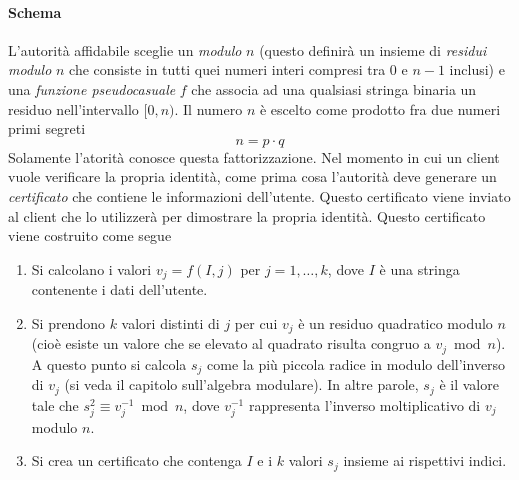 \documentclass{article}
\theoremstyle{definition}
\begin{document}
\paragraph{Schema}
L'autorità affidabile sceglie un \emph{modulo} $n$ (questo definirà un insieme di \emph{residui modulo} $n$ che consiste in tutti quei numeri interi compresi tra 0 e $n-1$ inclusi) e una \emph{funzione pseudocasuale} $f$ che associa ad una qualsiasi stringa binaria un residuo nell'intervallo $[0, n)$. Il numero $n$ è escelto come prodotto fra due numeri primi segreti
\begin{equation*}
    n = p \cdot q
\end{equation*}
Solamente l'atorità conosce questa fattorizzazione.
Nel momento in cui un client vuole verificare la propria identità, come prima cosa l'autorità deve generare un \emph{certificato} che contiene le informazioni dell'utente. Questo certificato viene inviato al client che lo utilizzerà per dimostrare la propria identità. Questo certificato viene costruito come segue
\begin{enumerate}
    \item Si calcolano i valori $v_j = f(I, j)$ per $j = 1, \dots, k$, dove $I$ è una stringa contenente i dati dell'utente.
    \item Si prendono $k$ valori distinti di $j$ per cui $v_j$ è un residuo quadratico modulo $n$ (cioè esiste un valore che se elevato al quadrato risulta congruo a $v_j \bmod n$). A questo punto si calcola $s_j$ come la più piccola radice in modulo dell'inverso di $v_j$ (si veda il capitolo sull'algebra modulare). In altre parole, $s_j$ è il valore tale che $s_j^2 \equiv v_j^{-1} \bmod n$, dove $v_j^{-1}$ rappresenta l'inverso moltiplicativo di $v_j$ modulo $n$.
    \item Si crea un certificato che contenga $I$ e i $k$ valori $s_j$ insieme ai rispettivi indici.
\end{enumerate}
\end{document}

